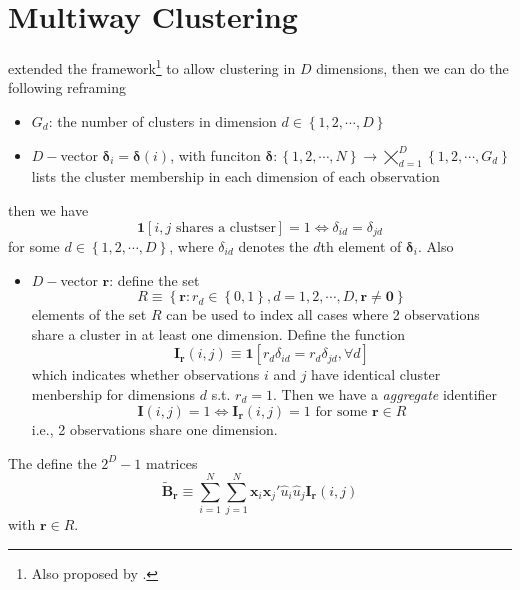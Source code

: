 \documentclass[twoside]{article}
\begin{document}
\section{Multiway Clustering}
\citet{cameron2011robust} extended the framework\footnote{Also proposed by \citet{thompson2011simple}.} to allow clustering in $D$ dimensions, then we can do the following reframing
\begin{itemize}
    \item $G_d$: the number of clusters in dimension $d\in \left\{ 1,2,\cdots,D \right\}$
    \item $D-$vector $\boldsymbol{\delta}_i = \boldsymbol{\delta}(i)$, with funciton $\boldsymbol{\delta}:\left\{1,2,\cdots,N\right\}\rightarrow \bigtimes ^D_{d=1}\left\{1,2,\cdots, G_d\right\}$ lists the cluster membership in each dimension of each observation
\end{itemize}
then we have 
$$
\mathbf{1}\left[i,j\text{ shares a clustser}\right] = 1 \Leftrightarrow \delta_{id}=\delta_{jd}
$$
for some $d\in \left\{1,2, \cdots, D\right\}$, where $\delta_{id}$ denotes the $d$th element of $\boldsymbol{\delta}_i$. Also 
\begin{itemize}
    \item $D-$vector $\mathbf{r}$: define the set $$ R\equiv \left\{ \mathbf{r}:r_d\in\left\{0,1\right\},d=1,2,\cdots,D,\mathbf{r\neq 0} \right\} $$
    elements of the set $R$ can be used to index all cases where 2 observations share a cluster in at least one dimension. Define the function 
    $$
    \mathbf{I_r} (i,j) \equiv \mathbf{1} \left[r_d\delta_{id} = r_d \delta_{jd},\forall d\right]
    $$
    which indicates whether observations $i$ and $j$ have identical cluster menbership for  dimensions $d$ s.t. $r_d=1$.
    Then we have a \textit{aggregate} identifier
    $$
    \mathbf{I}(i,j) = 1 \Leftrightarrow \mathbf{I_r}(i,j)=1\text{ for some }\mathbf{r}\in R
    $$
    i.e., 2 observations share  one dimension.
\end{itemize}
The define the $2^D-1$ matrices
\begin{equation}\label{eq:centermat_multiclu}
    \tilde{\mathbf{B}}_{\mathbf{r}}\equiv \sum^N_{i=1}\sum^N_{j=1}\mathbf{x}_i\mathbf{x}_j' \hat{u}_i\hat{u}_j\mathbf{I_r}(i,j)
\end{equation}
with $\mathbf{r}\in R$.
\end{document}
